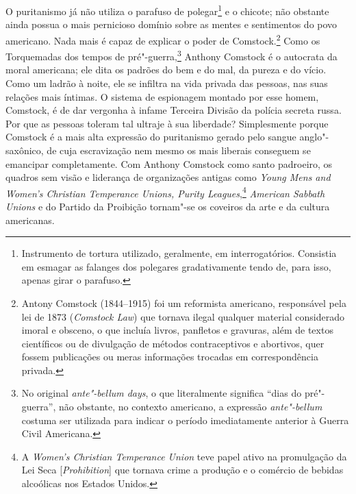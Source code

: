 O puritanismo já não utiliza o parafuso de polegar\footnote{Instrumento
  de tortura utilizado, geralmente, em interrogatórios. Consistia em
  esmagar as falanges dos polegares gradativamente tendo de, para isso,
  apenas girar o parafuso.} e o chicote; não obstante ainda possua o
mais pernicioso domínio sobre as mentes e sentimentos do povo americano.
Nada mais é capaz de explicar o poder de Comstock.\footnote{Antony
  Comstock (1844--1915) foi um reformista americano, responsável pela lei
  de 1873 (\emph{Comstock Law}) que tornava ilegal qualquer material
  considerado imoral e obsceno, o que incluía livros, panfletos e gravuras,
  além de textos científicos ou de divulgação de métodos contraceptivos
  e abortivos, quer fossem publicações ou meras informações trocadas em
  correspondência privada.} Como os Torquemadas dos tempos de
pré"-guerra,\footnote{No original \emph{ante"-bellum days}, o que
  literalmente significa ``dias do pré"-guerra'', não obstante, no
  contexto americano, a expressão \emph{ante"-bellum} costuma ser
  utilizada para indicar o período imediatamente anterior à Guerra Civil
  Americana.} Anthony Comstock é o autocrata da moral americana; ele
dita os padrões do bem e do mal, da pureza e do vício. Como um ladrão à
noite, ele se infiltra na vida privada das pessoas, nas suas relações
mais íntimas. O sistema de espionagem montado por esse homem, Comstock,
é de dar vergonha à infame Terceira Divisão da polícia secreta russa.
Por que as pessoas toleram tal ultraje à sua liberdade? Simplesmente
porque Comstock é a mais alta expressão do puritanismo gerado pelo
sangue anglo"-saxônico, de cuja escravização nem mesmo os mais liberais
conseguem se emancipar completamente. Com Anthony Comstock como santo
padroeiro, os quadros sem visão e liderança de organizações antigas %
como \emph{Young Mens and Women's Christian Temperance Unions, Purity %
Leagues},\footnote{A \emph{Women's Christian Temperance Union} teve papel
  ativo na promulgação da Lei Seca {[}\emph{Prohibition}{]} que tornava
  crime a produção e o comércio de bebidas alcoólicas nos Estados
  Unidos.} \emph{American Sabbath Unions} e do Partido da Proibição tornam"-se
os coveiros da arte e da cultura americanas.

